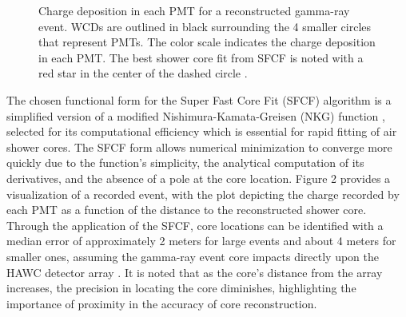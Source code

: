 \begin{figure}
    \caption{Charge deposition in each PMT for a reconstructed gamma-ray event. WCDs are outlined in black surrounding the 4 smaller circles that represent PMTs. The color scale indicates the charge deposition in each PMT. The best shower core fit from SFCF is noted with a red star in the center of the dashed circle \cite{Abeysekara_2017}.}
    \label{fig:core_fitter}
\end{figure}

The chosen functional form for the Super Fast Core Fit (SFCF) algorithm is a simplified version of a modified Nishimura-Kamata-Greisen (NKG) function \cite{cosmic_ray_shape}, selected for its computational efficiency which is essential for rapid fitting of air shower cores.
The SFCF form allows numerical minimization to converge more quickly due to the function's simplicity, the analytical computation of its derivatives, and the absence of a pole at the core location.
Figure 2 provides a visualization of a recorded event, with the plot depicting the charge recorded by each PMT as a function of the distance to the reconstructed shower core.
Through the application of the SFCF, core locations can be identified with a median error of approximately 2 meters for large events and about 4 meters for smaller ones, assuming the gamma-ray event core impacts directly upon the HAWC detector array \cite{Abeysekara_2017}.
It is noted that as the core's distance from the array increases, the precision in locating the core diminishes, highlighting the importance of proximity in the accuracy of core reconstruction.


